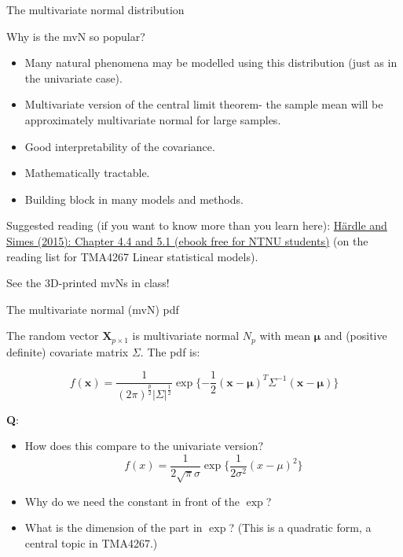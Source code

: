 \documentclass[ignorenonframetext,]{beamer}
\providecommand{\tightlist}{%
  \setlength{\itemsep}{0pt}\setlength{\parskip}{0pt}}
\begin{document}
\begin{frame}{The multivariate normal distribution}

Why is the mvN so popular?

\begin{itemize}
\tightlist
\item
  Many natural phenomena may be modelled using this distribution (just
  as in the univariate case).
\item
  Multivariate version of the central limit theorem- the sample mean
  will be approximately multivariate normal for large samples.
\item
  Good interpretability of the covariance.
\item
  Mathematically tractable.
\item
  Building block in many models and methods.
\end{itemize}

Suggested reading (if you want to know more than you learn here):
\href{https://link.springer.com/book/10.1007/978-3-540-72244-1}{Härdle
and Simes (2015): Chapter 4.4 and 5.1 (ebook free for NTNU students)}
(on the reading list for TMA4267 Linear statistical models).

\end{frame}

\begin{frame}

See the 3D-printed mvNs in class!

\end{frame}

\begin{frame}

\begin{block}{The multivariate normal (mvN) pdf}

The random vector \(\mathbf{X}_{p\times 1}\) is multivariate normal
\(N_p\) with mean \(\mathbf{\mu}\) and (positive definite) covariate
matrix \(\Sigma\). The pdf is:

\[f(\mathbf{x})=\frac{1}{(2\pi)^\frac{p}{2}|\Sigma|^\frac{1}{2}} \exp\{-\frac{1}{2}(\mathbf{x}-\mathbf{\mu})^T\Sigma^{-1}(\mathbf{x}-\mathbf{\mu})\}\]

\textbf{Q}:

\begin{itemize}
\tightlist
\item
  How does this compare to the univariate version?
  \[f(x)=\frac{1}{2\sqrt{\pi}\sigma}\exp\{ \frac{1}{2\sigma^2}(x-\mu)^2\}\]
\item
  Why do we need the constant in front of the \(\exp\)?
\item
  What is the dimension of the part in \(\exp\)? (This is a quadratic
  form, a central topic in TMA4267.)
\end{itemize}

\end{block}

\end{frame}
\end{document}
